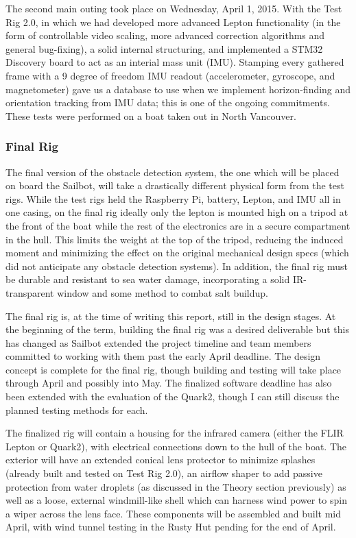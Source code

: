 The second main outing took place on Wednesday, April 1, 2015. With the Test Rig 2.0, in which we had developed more advanced Lepton functionality (in the form of controllable video scaling, more advanced correction algorithms and general bug-fixing), a solid internal structuring, and implemented a STM32 Discovery board to act as an interial mass unit (IMU). Stamping every gathered frame with a 9 degree of freedom IMU readout (accelerometer, gyroscope, and magnetometer) gave us a database to use when we implement horizon-finding and orientation tracking from IMU data; this is one of the ongoing commitments. These tests were performed on a boat taken out in North Vancouver.


\subsubsection{\label{sec:discussion:testing:testrig3}Final Rig}
The final version of the obstacle detection system, the one which will be placed on board the Sailbot, will take a drastically different physical form from the test rigs. While the test rigs held the Raspberry Pi, battery, Lepton, and IMU all in one casing, on the final rig ideally only the lepton is mounted high on a tripod at the front of the boat while the rest of the electronics are in a secure compartment in the hull. This limits the weight at the top of the tripod, reducing the induced moment and minimizing the effect on the original mechanical design specs (which did not anticipate any obstacle detection systems). In addition, the final rig must be durable and resistant to sea water damage, incorporating a solid IR-transparent window and some method to combat salt buildup. 

The final rig is, at the time of writing this report, still in the design stages. At the beginning of the term, building the final rig was a desired deliverable but this has changed as Sailbot extended the project timeline and team members committed to working with them past the early April deadline. The design concept is complete for the final rig, though building and testing will take place through April and possibly into May. The finalized software deadline has also been extended with the evaluation of the Quark2, though I can still discuss the planned testing methods for each.

The finalized rig will contain a housing for the infrared camera (either the FLIR Lepton or Quark2), with electrical connections down to the hull of the boat. The exterior will have an extended conical lens protector to minimize splashes (already built and tested on Test Rig 2.0), an airflow shaper to add passive protection from water droplets (as discussed in the Theory section previously) as well as a loose, external windmill-like shell which can harness wind power to spin a wiper across the lens face. These components will be assembled and built mid April, with wind tunnel testing in the Rusty Hut pending for the end of April.

